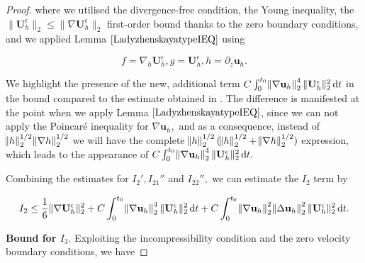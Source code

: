 \documentclass[11pt]{article}
\newcommand*\diff{\mathop{}\!\mathrm{d}}
\begin{document}
\begin{proof}
  where we utilised the divergence-free condition, the Young inequality, the $\| \mathbf{U}_h^\epsilon \|_2 \leq \| \nabla \mathbf{U}_h^\epsilon \|_2$ first-order bound thanks to the zero boundary conditions, and we applied Lemma $\ref{LadyzhenskayatypeIEQ}$ using
  
  $$f = \nabla_h \mathbf{U}_h^\epsilon, g = \mathbf{U}_h^\epsilon, h = \partial_z \mathbf{u}_h.$$
   
  We highlight the presence of the new, additional term $C \int_0^{t_0} \norm{\nabla \mathbf{u}_h}_2^4 \| \mathbf{U}_h^\epsilon \| _2^2 \diff t$ in the bound compared to the estimate obtained in \cite{li2019primitive}. The difference is manifested at the point when we apply Lemma $\ref{LadyzhenskayatypeIEQ}$, since we can not apply the Poincar\'e inequality for $\nabla \mathbf{u}_h,$ and as a consequence, instead of $\norm{h}_2^{1/2} \norm{\nabla h}_2^{1/2}$ we will have the complete $\norm{h}_2^{1/2} (\norm{h}_2^{1/2} + \norm{\nabla h}_2^{1/2})$  expression, which leads to the appearance of $C \int_0^{t_0} \norm{\nabla \mathbf{u}_h}_2^4 \| \mathbf{U}_h^\epsilon \|_2^2 \diff t.$
  
  Combining the estimates for $I_2', I_{21}''$ and $I_{22}'',$ we can estimate the $I_2$ term by
  
  $$ I_2 \leq \frac{1}{6} \| \nabla \mathbf{U}_h^\epsilon \| ^2_2 + C \int_0^{t_0} \norm{\nabla \mathbf{u}_h}_2^4 \| \mathbf{U}_h^\epsilon \| _2^2 \diff t + C \int_0^{t_0} \norm{\nabla \mathbf{u}_h}_2^2  \norm{\Delta \mathbf{u}_h}_2^2 \| \mathbf{U}_h^\epsilon \| _2^2 \diff t. $$
  
  \textbf{Bound for $I_3.$} Exploiting the incompressibility condition and the zero velocity boundary conditions, we have
  

\end{proof}
\end{document}
